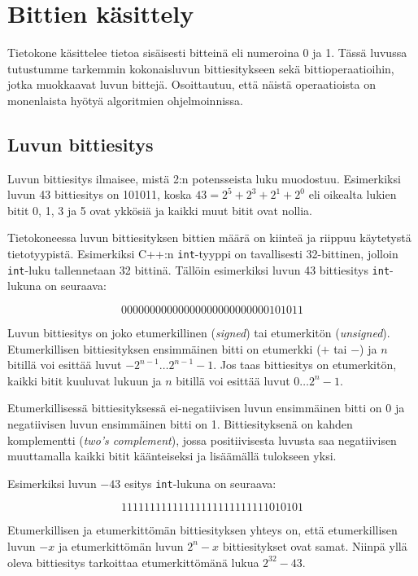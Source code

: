 \chapter{Bittien käsittely}

Tietokone käsittelee tietoa sisäisesti bitteinä
eli numeroina 0 ja 1.
Tässä luvussa tutustumme tarkemmin kokonaisluvun
bittiesitykseen sekä bittioperaatioihin,
jotka muokkaavat luvun bittejä.
Osoittautuu, että näistä operaatioista on
monenlaista hyötyä algoritmien ohjelmoinnissa.

\section{Luvun bittiesitys}


Luvun bittiesitys ilmaisee, mistä 2:n potensseista
luku muodostuu. Esimerkiksi luvun 43 bittiesitys on 101011, koska
$43 = 2^5 + 2^3 + 2^1 + 2^0$
eli oikealta lukien bitit 0, 1, 3 ja 5 ovat ykkösiä
ja kaikki muut bitit ovat nollia.

Tietokoneessa luvun bittiesityksen
bittien määrä on kiinteä ja riippuu käytetystä tietotyypistä.
Esimerkiksi C++:n \texttt{int}-tyyppi on tavallisesti 32-bittinen,
jolloin \texttt{int}-luku tallennetaan 32 bittinä.
Tällöin esimerkiksi luvun 43 bittiesitys \texttt{int}-lukuna on seuraava:

\[00000000000000000000000000101011\]

Luvun bittiesitys on joko etumerkillinen (\textit{signed})
tai etumerkitön (\textit{unsigned}).
Etumerkillisen bittiesityksen ensimmäinen bitti on etumerkki
($+$ tai $-$) ja $n$ bitillä voi esittää luvut $-2^{n-1} \ldots 2^{n-1}-1$.
Jos taas bittiesitys on etumerkitön,
kaikki bitit kuuluvat lukuun ja $n$ bitillä voi esittää luvut $0 \ldots 2^n-1$.

Etumerkillisessä bittiesityksessä ei-negatiivisen luvun
ensimmäinen bitti on 0 ja negatiivisen luvun
ensimmäinen bitti on 1.
Bittiesityksenä on kahden komplementti
(\textit{two's complement}),
jossa positiivisesta luvusta saa negatiivisen muuttamalla
kaikki bitit käänteiseksi ja lisäämällä
tulokseen yksi.

Esimerkiksi luvun $-43$ esitys \texttt{int}-lukuna on seuraava:

\[11111111111111111111111111010101\]

Etumerkillisen ja etumerkittömän bittiesityksen
yhteys on, että etumerkillisen luvun $-x$
ja etumerkittömän luvun $2^n-x$ bittiesitykset ovat samat.
Niinpä yllä oleva bittiesitys tarkoittaa
etumerkittömänä lukua $2^{32}-43$.

